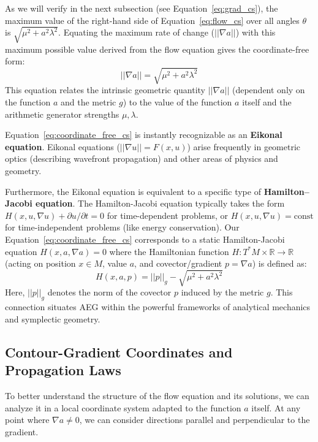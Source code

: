 \documentclass[12pt]{article}
\begin{document}
As we will verify in the next subsection (see Equation~\eqref{eq:grad_cs}), the maximum value of the right-hand side of Equation~\eqref{eq:flow_cs} over all angles \( \theta \) is \( \sqrt{\mu^2 + a^2 \lambda^2} \). Equating the maximum rate of change (\( ||\nabla a|| \)) with this maximum possible value derived from the flow equation gives the coordinate-free form:
\begin{equation}\label{eq:coordinate_free_cs}
||\nabla a|| = \sqrt{\mu^2 + a^2 \lambda^2}
\end{equation}
This equation relates the intrinsic geometric quantity \( ||\nabla a|| \) (dependent only on the function \( a \) and the metric \( g \)) to the value of the function \( a \) itself and the arithmetic generator strengths \( \mu, \lambda \).

Equation~\eqref{eq:coordinate_free_cs} is instantly recognizable as an \textbf{Eikonal equation}. Eikonal equations (\( ||\nabla u|| = F(x, u) \)) arise frequently in geometric optics (describing wavefront propagation) and other areas of physics and geometry.

Furthermore, the Eikonal equation is equivalent to a specific type of \textbf{Hamilton–Jacobi equation}. The Hamilton-Jacobi equation typically takes the form \( H(x, u, \nabla u) + \partial u / \partial t = 0 \) for time-dependent problems, or \( H(x, u, \nabla u) = \text{const} \) for time-independent problems (like energy conservation). Our Equation~\eqref{eq:coordinate_free_cs} corresponds to a static Hamilton-Jacobi equation \( H(x, a, \nabla a) = 0 \) where the Hamiltonian function \( H: T^*M \times \mathbb{R} \to \mathbb{R} \) (acting on position \( x \in M \), value \( a \), and covector/gradient \( p = \nabla a \)) is defined as:
\begin{equation}\label{eq:hamiltonian_cs}
    H(x, a, p) = ||p||_g - \sqrt{\mu^2 + a^2 \lambda^2}
\end{equation}
Here, \( ||p||_g \) denotes the norm of the covector \( p \) induced by the metric \( g \). This connection situates AEG within the powerful frameworks of analytical mechanics and symplectic geometry.

\subsection{Contour-Gradient Coordinates and Propagation Laws} %

To better understand the structure of the flow equation and its solutions, we can analyze it in a local coordinate system adapted to the function \( a \) itself. At any point where \( \nabla a \neq 0 \), we can consider directions parallel and perpendicular to the gradient.
\end{document}
